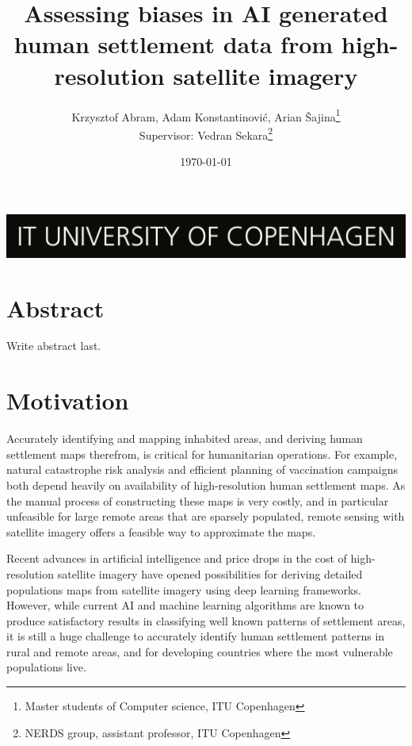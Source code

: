 \documentclass[11pt]{article}
\title{Assessing biases in AI generated human settlement data from high-resolution satellite imagery}
\author{Krzysztof Abram, Adam Konstantinovi\'{c}, Arian \v{S}ajina\thanks{Master students of Computer science, ITU Copenhagen} \\
        Supervisor: Vedran Sekara\thanks{NERDS group, assistant professor, ITU Copenhagen}}
\date{\today}
\begin{document}
    \maketitle
    \vfill
    \includegraphics[width=\textwidth]{itu_logo.jpg}
    \newpage

    \section*{Abstract}
        Write abstract last.


    \section{Motivation}

    Accurately identifying and mapping inhabited areas, and deriving human settlement maps therefrom, is critical
    for humanitarian operations. For example, natural catastrophe risk analysis and efficient planning of vaccination
    campaigns both depend heavily on availability of high-resolution human settlement maps. As the manual process
    of constructing these maps is very costly, and in particular unfeasible for large remote areas that are sparsely
    populated, remote sensing with satellite imagery offers a feasible way to approximate the maps.

    Recent advances in artificial intelligence and price drops in the cost of high-resolution satellite imagery
    have opened possibilities for deriving detailed populations maps from satellite imagery using deep learning frameworks.
    However, while current AI and machine learning algorithms are known to produce satisfactory results in
    classifying well known patterns of settlement areas, it is still a huge challenge to accurately identify
    human settlement patterns in rural and remote areas, and for developing countries where the most vulnerable
    populations live.
\end{document}
